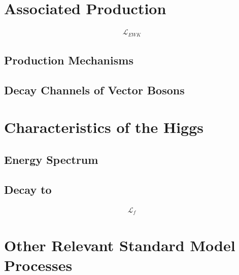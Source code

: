 \section{Associated Production}

\begin{gather}
  \mathcal{L}_{EWK}
\end{gather}

\subsection{Production Mechanisms}

\subsection{Decay Channels of Vector Bosons}

\section{Characteristics of the Higgs}

\subsection{Energy Spectrum}

\subsection{Decay to \bb}

\begin{gather}
  \mathcal{L}_{f}
\end{gather}

\section{Other Relevant Standard Model Processes}
